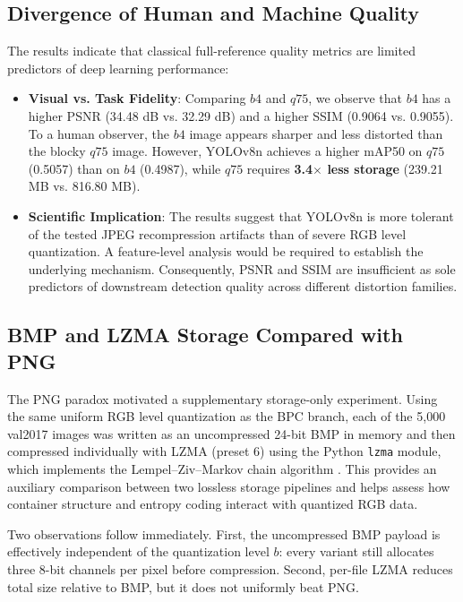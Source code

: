 \documentclass[12pt, a4paper]{article}
\begin{document}
\subsection{Divergence of Human and Machine Quality}
The results indicate that classical full-reference quality metrics are limited predictors of deep learning performance:
\begin{itemize}
    \item \textbf{Visual vs. Task Fidelity}: Comparing $b4$ and $q75$, we observe that $b4$ has a higher PSNR (34.48 dB vs. 32.29 dB) and a higher SSIM (0.9064 vs. 0.9055). To a human observer, the $b4$ image appears sharper and less distorted than the blocky $q75$ image. However, YOLOv8n achieves a higher mAP50 on $q75$ (0.5057) than on $b4$ (0.4987), while $q75$ requires \textbf{3.4$\times$ less storage} (239.21 MB vs. 816.80 MB).
    \item \textbf{Scientific Implication}: The results suggest that YOLOv8n is more tolerant of the tested JPEG recompression artifacts than of severe RGB level quantization. A feature-level analysis would be required to establish the underlying mechanism. Consequently, PSNR and SSIM are insufficient as sole predictors of downstream detection quality across different distortion families.
\end{itemize}

\subsection{BMP and LZMA Storage Compared with PNG}
The PNG paradox motivated a supplementary storage-only experiment. Using the same uniform RGB level quantization as the BPC branch, each of the 5,000 val2017 images was written as an uncompressed 24-bit BMP in memory and then compressed individually with LZMA (preset 6) using the Python \texttt{lzma} module, which implements the Lempel--Ziv--Markov chain algorithm \cite{pavlov2013}. This provides an auxiliary comparison between two lossless storage pipelines and helps assess how container structure and entropy coding interact with quantized RGB data.

Two observations follow immediately. First, the uncompressed BMP payload is effectively independent of the quantization level $b$: every variant still allocates three 8-bit channels per pixel before compression. Second, per-file LZMA reduces total size relative to BMP, but it does not uniformly beat PNG.
\end{document}
